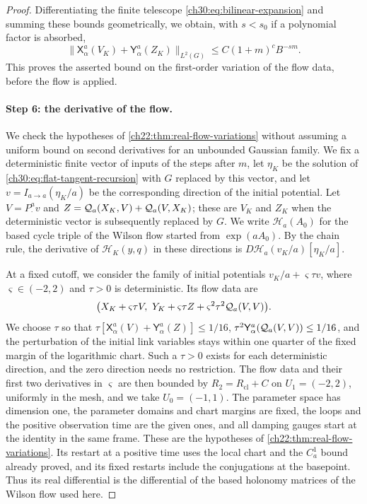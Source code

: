 \begin{proof}
Differentiating the finite telescope \eqref{ch30:eq:bilinear-expansion} and summing these bounds geometrically, we obtain, with $s<s_0$ if a polynomial factor is absorbed,
\begin{equation}\label{ch30:eq:linear-enhanced-tail}
 \bigl\lVert\mathsf X_\alpha^a(V_K)+\mathsf Y_\alpha^a(Z_K)\bigr\rVert_{L^2(G)}\le C(1+m)^cB^{-sm}.
\end{equation}
This proves the asserted bound on the first-order variation of the flow data, before the flow is applied.

\paragraph{Step 6: the derivative of the flow.} We check the hypotheses of \cref{ch22:thm:real-flow-variations} without assuming a uniform bound on second derivatives for an unbounded Gaussian family. We fix a deterministic finite vector of inputs of the steps after $m$, let $\eta_K$ be the solution of \eqref{ch30:eq:flat-tangent-recursion} with $G$ replaced by this vector, and let $v=I_{a\to a}(\eta_K/a)$ be the corresponding direction of the initial potential. Let $V=P_\cdot^av$ and $Z=\mathcal Q_{a}(X_K,V)+\mathcal Q_{a}(V,X_K)$; these are $V_K$ and $Z_K$ when the deterministic vector is subsequently replaced by $G$. We write $\mathscr H_a(A_0)$ for the based cycle triple of the Wilson flow started from $\exp(aA_0)$. By the chain rule, the derivative of $\mathcal H_K(y,q)$ in these directions is $D\mathscr H_a(v_K/a)[\eta_K/a]$.

At a fixed cutoff, we consider the family of initial potentials $v_K/a+\varsigma\tau v$, where $\varsigma\in(-2,2)$ and $\tau>0$ is deterministic. Its flow data are
\[
 \bigl(X_K+\varsigma\tau V,\ Y_K+\varsigma\tau Z+\varsigma^2\tau^2\mathcal Q_{a}(V,V)\bigr).
\]
We choose $\tau$ so that $\tau[\mathsf X_\alpha^a(V)+\mathsf Y_\alpha^a(Z)]\le1/16$, $\tau^2\mathsf Y_\alpha^a(\mathcal Q_{a}(V,V))\le1/16$, and the perturbation of the initial link variables stays within one quarter of the fixed margin of the logarithmic chart. Such a $\tau>0$ exists for each deterministic direction, and the zero direction needs no restriction. The flow data and their first two derivatives in $\varsigma$ are then bounded by $R_2=R_{\mathrm{cl}}+C$ on $U_1=(-2,2)$, uniformly in the mesh, and we take $U_0=(-1,1)$. The parameter space has dimension one, the parameter domains and chart margins are fixed, the loops and the positive observation time are the given ones, and all damping gauges start at the identity in the same frame. These are the hypotheses of \cref{ch22:thm:real-flow-variations}. Its restart at a positive time uses the local chart and the $C_a^1$ bound already proved, and its fixed restarts include the conjugations at the basepoint. Thus its real differential is the differential of the based holonomy matrices of the Wilson flow used here.


\end{proof}
